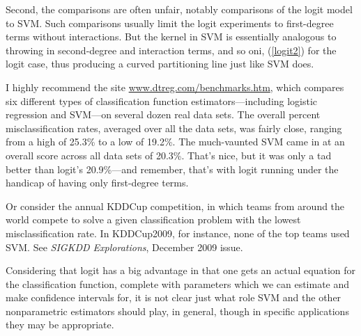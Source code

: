 Second, the comparisons are often unfair, notably comparisons of the
logit model to SVM.  Such comparisons usually limit the logit
experiments to first-degree terms without interactions.  But the kernel
in SVM is essentially analogous to throwing in second-degree and
interaction terms, and so oni, (\ref{logit2}) for the logit case, thus
producing a curved partitioning line just like SVM does.

I highly recommend the site \url{www.dtreg.com/benchmarks.htm}, which
compares six different types of classification function
estimators---including logistic regression and SVM---on several dozen
real data sets.  The overall percent misclassification rates, averaged
over all the data sets, was fairly close, ranging from a high of 25.3\%
to a low of 19.2\%.  The much-vaunted SVM came in at an overall score
across all data sets of 20.3\%.  That's nice, but it was only a tad
better than logit's 20.9\%---and remember, that's with logit running
under the handicap of having only first-degree terms.

Or consider the annual KDDCup competition, in which teams from around
the world compete to solve a given classification problem with the
lowest misclassification rate.  In KDDCup2009, for instance, none of the
top teams used SVM.  See {\it SIGKDD Explorations}, December 2009 issue.

Considering that logit has a big advantage in that one gets an actual
equation for the classification function, complete with parameters which
we can estimate and make confidence intervals for, it is not clear just
what role SVM and the other nonparametric estimators should play, in
general, though in specific applications they may be appropriate.

